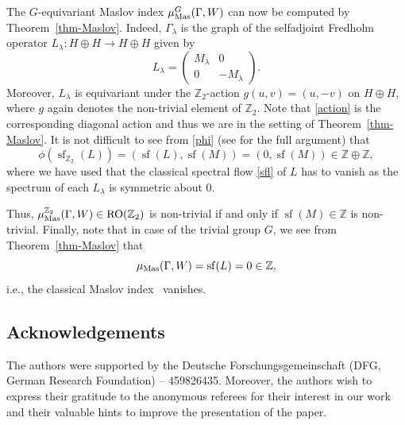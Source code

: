 \documentclass[pdftex]{sigma}
\numberwithin{equation}{section}
\theoremstyle{definition}
\DeclareMathOperator{\sfl}{sf}
\begin{document}
The $G$-equivariant Maslov index $\mu^G_{\rm Mas}(\Gamma,W)$ can now be computed by Theorem~\ref{thm-Maslov}. Indeed, $\Gamma_\lambda$ is the graph of the selfadjoint Fredholm operator $L_\lambda\colon H\oplus H\rightarrow H\oplus H$ given by
\[L_\lambda=\begin{pmatrix}
M_\lambda&0\\
0&-M_\lambda
\end{pmatrix}.\]
Moreover, $L_\lambda$ is equivariant under the $\mathbb{Z}_2$-action $g(u,v)=(u,-v)$ on $H\oplus H$, where $g$ again denotes the non-trivial element of $\mathbb{Z}_2$. Note that \eqref{action} is the corresponding diagonal action and thus we are in the setting of Theorem~\ref{thm-Maslov}. It is not difficult to see from \eqref{phi} (see \cite[Section~2.4]{MJN21} for the full argument) that
\[\phi(\sfl_{\mathbb{Z}_2}(L))=(\sfl(L),\sfl(M))=(0,\sfl(M))\in\mathbb{Z}\oplus\mathbb{Z},\]
where we have used that the classical spectral flow \eqref{sfl} of $L$ has to vanish as the spectrum of each $L_\lambda$ is symmetric about $0$.

Thus, $\mu^{\mathbb{Z}_2}_{\rm Mas}(\Gamma,W)\in \mathrm{RO}(\mathbb{Z}_2)$ is non-trivial if and only if $\sfl(M)\in\mathbb{Z}$ is non-trivial. Finally, note that in case of the trivial group $G$, we see from Theorem~\ref{thm-Maslov} that
\[\mu_{\rm Mas}(\Gamma,W)=\sfl(L)=0\in\mathbb{Z},\]
i.e., the classical Maslov index~\cite{Bernhelm} vanishes.

\subsection*{Acknowledgements}
The authors were supported by the Deutsche Forschungsgemeinschaft (DFG, German Research Foundation) -- 459826435. Moreover, the authors wish to express their gratitude to the anonymous referees for their interest in our work and their valuable hints to improve the presentation of the paper.
\end{document}
